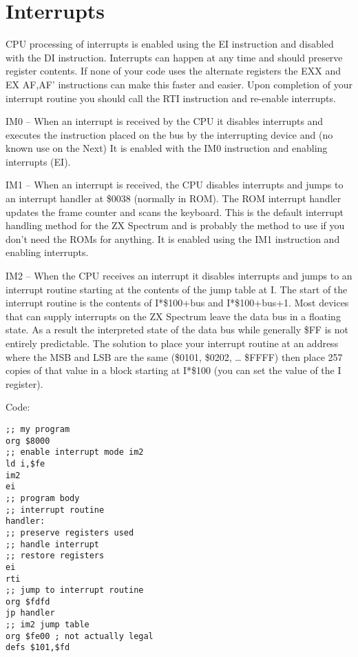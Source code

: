 \chapter{Interrupts}
CPU processing of interrupts is enabled using the EI instruction and
disabled with the DI instruction. Interrupts can happen at any time
and should preserve register contents.  If none of your code uses the
alternate registers the EXX and EX AF,AF’ instructions can make this
faster and easier. Upon completion of your interrupt routine you
should call the RTI instruction and re-enable interrupts.
 
IM0 – When an interrupt is received by the CPU it disables interrupts
and executes the instruction placed on the bus by the interrupting
device and (no known use on the Next) It is enabled with the IM0
instruction and enabling interrupts (EI).

IM1 – When an interrupt is received, the CPU disables interrupts and
jumps to an interrupt handler at \$0038 (normally in ROM). The ROM
interrupt handler updates the frame counter and scans the
keyboard. This is the default interrupt handling method for the ZX
Spectrum and is probably the method to use if you don’t need the ROMs
for anything. It is enabled using the IM1 instruction and enabling
interrupts.

IM2 – When the CPU receives an interrupt it disables interrupts and
jumps to an interrupt routine starting at the contents of the jump
table at I. The start of the interrupt routine is the contents of
I*\$100+bus and I*\$100+bus+1. Most devices that can supply interrupts
on the ZX Spectrum leave the data bus in a floating state.  As a
result the interpreted state of the data bus while generally \$FF is
not entirely predictable.  The solution to place your interrupt
routine at an address where the MSB and LSB are the same (\$0101,
\$0202, … \$FFFF) then place 257 copies of that value in a block
starting at I*\$100 (you can set the value of the I register).

Code:
\begin{verbatim}
;; my program
org $8000
;; enable interrupt mode im2
ld i,$fe
im2
ei
;; program body
;; interrupt routine
handler:
;; preserve registers used
;; handle interrupt
;; restore registers
ei
rti
;; jump to interrupt routine
org $fdfd
jp handler
;; im2 jump table
org $fe00 ; not actually legal
defs $101,$fd
\end{verbatim}
